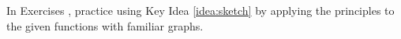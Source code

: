 {\noindent In Exercises}
{, practice using Key Idea \ref{idea:sketch} by applying the principles to the given functions with familiar graphs.
}
